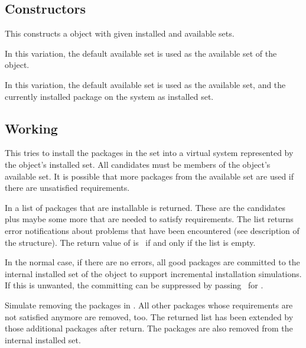 \documentclass[10pt]{article}
\begin{document}

\subsection{Constructors}

This constructs a  object with given installed and
available sets.

In this variation, the default available set is used as the available
set of the object.

In this variation, the default available set is used as the available
set, and the currently installed package on the system as installed set.


\subsection{Working}
This tries to install the packages in the  set into a
virtual system represented by the object's installed set. All
candidates must be members of the object's available set. It is
possible that more packages from the available set are used if there
are unsatisfied requirements.

In  a list of packages that are installable is returned.
These are the candidates plus maybe some more that are needed to
satisfy requirements. The  list returns error notifications
about problems that have been encountered (see description of the
 structure). The return value of  is
\true\ if and only if the  list is empty.

In the normal case, if there are no errors, all good packages are
committed to the internal installed set of the  object
to support incremental installation simulations. If this is unwanted,
the committing can be suppressed by passing \false\ for
.

Simulate removing the packages in . All other packages whose
requirements are not satisfied anymore are removed, too. The returned
 list has been extended by those additional packages after
return. The packages are also removed from the internal installed set.
\end{document}
